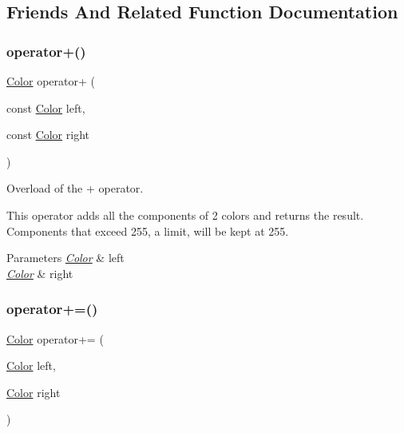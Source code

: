 \subsection{Friends And Related Function Documentation}
\mbox{\label{classjetfuel_1_1draw_1_1Color_ab6396e36884cc40f26e35f2ef17ce38b}} 
\subsubsection{\texorpdfstring{operator+()}{operator+()}}
{\footnotesize\ttfamily \hyperlink{classjetfuel_1_1draw_1_1Color}{Color} operator+ (\begin{DoxyParamCaption}\item[{const \hyperlink{classjetfuel_1_1draw_1_1Color}{Color}}]{left,  }\item[{const \hyperlink{classjetfuel_1_1draw_1_1Color}{Color}}]{right }\end{DoxyParamCaption})\hspace{0.3cm}{\ttfamily [related]}}



Overload of the + operator. 

This operator adds all the components of 2 colors and returns the result. Components that exceed 255, a limit, will be kept at 255.


\begin{DoxyParams}{Parameters}
{\em \hyperlink{classjetfuel_1_1draw_1_1Color}{Color}} & left \\
\hline
{\em \hyperlink{classjetfuel_1_1draw_1_1Color}{Color}} & right \\
\hline
\end{DoxyParams}
\mbox{\label{classjetfuel_1_1draw_1_1Color_a226f4b8ca4054f4cb338e7c33bbc71c5}} 
\subsubsection{\texorpdfstring{operator+=()}{operator+=()}}
{\footnotesize\ttfamily \hyperlink{classjetfuel_1_1draw_1_1Color}{Color} operator+= (\begin{DoxyParamCaption}\item[{\hyperlink{classjetfuel_1_1draw_1_1Color}{Color}}]{left,  }\item[{\hyperlink{classjetfuel_1_1draw_1_1Color}{Color}}]{right }\end{DoxyParamCaption})\hspace{0.3cm}{\ttfamily [related]}}



